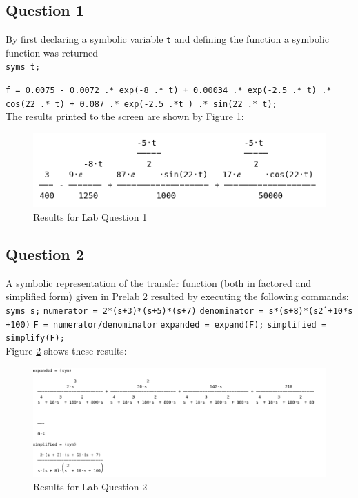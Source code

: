 \documentclass[12pt, a4paper]{article}
\begin{document}
	\subsection{Question 1}
	By first declaring a symbolic variable \texttt{t} and defining the function a symbolic function was returned\\


	\texttt{syms t;}\par
  	\texttt{f = 0.0075 - 0.0072 .* exp(-8 .* t) + 0.00034 .* exp(-2.5 .* t) .* cos(22 .* t) + 0.087 .* exp(-2.5 .*t ) .* sin(22 .* t);}\\

  	The results printed to the screen are shown by Figure \ref{fig:question_1}:\\

  	\begin{figure}[H]
		\centering
		\includegraphics[width=\textwidth]{question_1}
		\caption{Results for Lab Question 1}
		\label{fig:question_1}
	\end{figure}

	\subsection*{Question 2}
	A symbolic representation of the transfer function (both in factored and simplified form) given in Prelab 2 resulted by executing the following commands:\\

	\texttt{syms s;}
    \texttt{numerator = 2*(s+3)*(s+5)*(s+7)}
    \texttt{denominator = s*(s+8)*(s\^2 +10*s +100)}
    \texttt{F = numerator/denominator}
    \texttt{expanded = expand(F);}
    \texttt{simplified = simplify(F);}\\


    Figure \ref{fig:question_2} shows these results:\\

    \begin{figure}[H]
		\centering
		\includegraphics[width=\textwidth]{question_2}
		\caption{Results for Lab Question 2}
		\label{fig:question_2}
	\end{figure}
\end{document}
